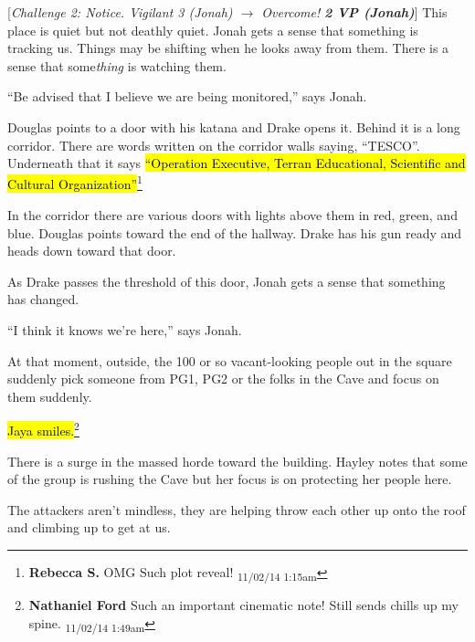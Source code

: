 {[}\textit{Challenge 2: Notice.  Vigilant 3 (Jonah) $\rightarrow$ Overcome! }\textit{\textbf{2 VP (Jonah)}}{]}  This place is quiet but not deathly quiet.  Jonah gets a sense that something is tracking us.  Things may be shifting when he looks away from them.  There is a sense that some\textit{thing} is watching them.

``Be advised that I believe we are being monitored,'' says Jonah.

Douglas points to a door with his katana and Drake opens it.  Behind it is a long corridor.  There are words written on the corridor walls saying, ``TESCO''.  Underneath that it says \hl{``Operation Executive, Terran Educational, Scientific and Cultural Organization''}\footnote{\textbf{Rebecca S. }OMG
Such plot reveal! \textsubscript{11/02/14 1:15am}}

In the corridor there are various doors with lights above them in red, green, and blue. Douglas points toward the end of the hallway.  Drake has his gun ready and heads down toward that door.

As Drake passes the threshold of this door, Jonah gets a sense that something has changed.

``I think it knows we're here,'' says Jonah.



\newpage
{}

At that moment, outside, the 100 or so vacant-looking people out in the square suddenly pick someone from PG1, PG2 or the folks in the Cave and focus on them suddenly.



\hl{Jaya smiles.}\footnote{\textbf{Nathaniel Ford }Such an important cinematic note! Still sends chills up my spine. \textsubscript{11/02/14 1:49am}}



There is a surge in the massed horde toward the building.  Hayley notes that some of the group is rushing the Cave but her focus is on protecting her people here.

The attackers aren't mindless, they are helping throw each other up onto the roof and climbing up to get at us.

